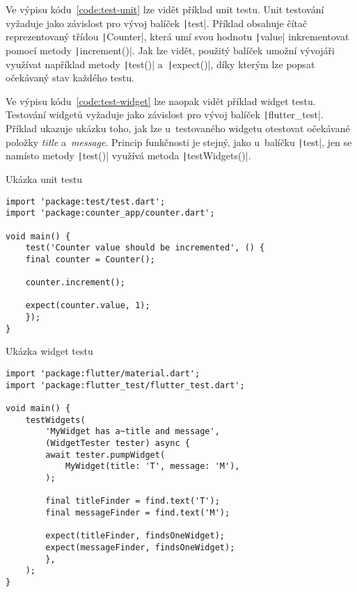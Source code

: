 Ve výpisu kódu~\ref{code:test-unit} lze vidět příklad unit testu.
Unit testování vyžaduje jako závislost pro vývoj balíček
\texttt|test|.
Příklad obsahuje čítač reprezentovaný třídou \texttt|Counter|,
která umí svou hodnotu \texttt|value| inkrementovat pomocí
metody \texttt|increment()|.
Jak lze vidět,
použitý balíček umožní vývojáři využívat například metody
\texttt|test()| a~\texttt|expect()|,
díky kterým lze popsat očekávaný stav každého testu.~\cite{testing_flutter_unit}

Ve výpisu kódu~\ref{code:test-widget} lze naopak vidět příklad widget testu.
Testování widgetů vyžaduje jako závislost pro vývoj balíček
\texttt|flutter_test|.
Příklad ukazuje ukázku toho,
jak lze u~testovaného widgetu otestovat očekávané položky \emph{title}
a~\emph{message}.
Princip funkčnosti je stejný,
jako u~balíčku \texttt|test|,
jen se namísto metody \texttt|test()|
využívá metoda \texttt|testWidgets()|.~\cite{testing_flutter_widget}

\begin{listing}
    \caption{Ukázka unit testu~\cite{testing_flutter_unit}}
    \label{code:test-unit}
    \begin{verbatim}
import 'package:test/test.dart';
import 'package:counter_app/counter.dart';

void main() {
    test('Counter value should be incremented', () {
    final counter = Counter();

    counter.increment();

    expect(counter.value, 1);
    });
}
    \end{verbatim}
\end{listing}

\begin{listing}
    \caption{Ukázka widget testu~\cite{testing_flutter_widget}}
    \label{code:test-widget}
    \begin{verbatim}
import 'package:flutter/material.dart';
import 'package:flutter_test/flutter_test.dart';

void main() {
    testWidgets(
        'MyWidget has a~title and message',
        (WidgetTester tester) async {
        await tester.pumpWidget(
            MyWidget(title: 'T', message: 'M'),
        );

        final titleFinder = find.text('T');
        final messageFinder = find.text('M');

        expect(titleFinder, findsOneWidget);
        expect(messageFinder, findsOneWidget);
        },
    );
}
    \end{verbatim}
\end{listing}

